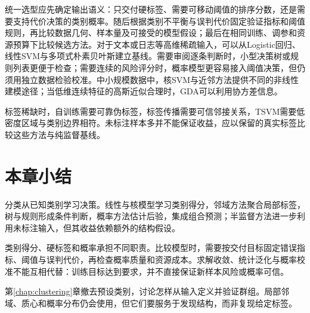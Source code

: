 统一选型应先确定输出语义：只交付硬标签、需要可移动阈值的排序分数，还是需要支持代价决策的类别概率。随后根据类别不平衡与误判代价固定验证指标和阈值规则，再比较数据几何、样本量及可接受的模型假设；最后在相同训练、调参和资源预算下比较候选方法。对于文本或日志等高维稀疏输入，可以从Logistic回归、线性SVM与多项式朴素贝叶斯建立基线。需要审阅逐条判断时，小型决策树或规则列表更便于检查；需要连续的风险评分时，概率模型更容易接入阈值决策，但仍须用独立数据检验校准。中小规模数据中，核SVM与近邻方法提供不同的非线性建模途径；当低维连续特征的高斯近似合理时，GDA可以利用协方差信息。

标签稀缺时，自训练需要可靠伪标签，标签传播需要可信邻接关系，TSVM需要低密度区域与类别边界相符。未标注样本多并不能保证收益，应以保留的真实标签比较这些方法与纯监督基线。

\section{本章小结}
\label{sec:classification-summary}

分类从已知类别学习决策。线性与核模型学习类别得分，邻域方法聚合局部标签，树与规则形成条件判断，概率方法估计后验，集成组合预测；半监督方法进一步利用未标注输入，但其收益依赖额外的结构假设。

类别得分、硬标签和概率承担不同职责。比较模型时，需要按交付目标固定错误指标、阈值与误判代价，再检查概率质量和资源成本。求解收敛、统计泛化与概率校准不能互相代替：训练目标达到要求，并不直接保证新样本风险或概率可信。

第\ref{chap:clustering}章撤去预设类别，讨论怎样从输入定义并验证群组。局部邻域、质心和概率分布仍会使用，但它们要服务于发现结构，而非复现给定标签。
